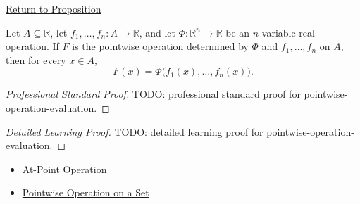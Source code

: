 \newpage
{}
\label{prf:pointwise-operation-evaluation}

\begin{remark*}[Return]
\hyperref[prop:pointwise-operation-evaluation]{Return to Proposition}
\end{remark*}

\begin{proposition*}
Let \(A\subseteq\mathbb{R}\), let \(f_1,\ldots,f_n:A\to\mathbb{R}\),
and let \(\Phi:\mathbb{R}^n\to\mathbb{R}\) be an \(n\)-variable real
operation.  If \(F\) is the pointwise operation determined by
\(\Phi\) and \(f_1,\ldots,f_n\) on \(A\), then for every \(x\in A\),
\[
  F(x)
  =
  \Phi\bigl(f_1(x),\ldots,f_n(x)\bigr).
\]
\end{proposition*}

\begin{proof}[Professional Standard Proof]
\LRAProofBodyStart
TODO: professional standard proof for pointwise-operation-evaluation.
\end{proof}

\begin{proof}[Detailed Learning Proof]
\LRAProofBodyStart
TODO: detailed learning proof for pointwise-operation-evaluation.
\end{proof}

\begin{remark*}
\end{remark*}

\begin{dependencies}
\begin{itemize}
  \item \hyperref[def:at-point-operation]{At-Point Operation}
  \item \hyperref[def:pointwise-operation-on-set]{Pointwise Operation on a Set}
\end{itemize}
\end{dependencies}

\clearpage
